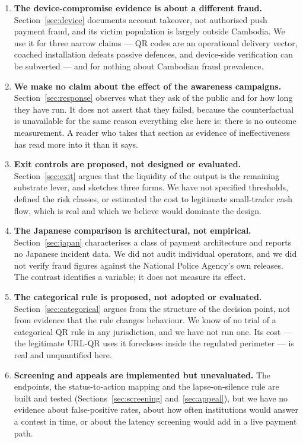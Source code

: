 \documentclass[10pt,a4paper,twocolumn]{article}
\begin{document}
\begin{enumerate}[leftmargin=1.6em]
  \item \textbf{The device-compromise evidence is about a different fraud.}
    Section~\ref{sec:device} documents account takeover, not authorised push
    payment fraud, and its victim population is largely outside Cambodia. We use
    it for three narrow claims --- QR codes are an operational delivery vector,
    coached installation defeats passive defences, and device-side verification
    can be subverted --- and for nothing about Cambodian fraud prevalence.

  \item \textbf{We make no claim about the effect of the awareness campaigns.}
    Section~\ref{sec:response} observes what they ask of the public and for how
    long they have run. It does not assert that they failed, because the
    counterfactual is unavailable for the same reason everything else here is:
    there is no outcome measurement. A reader who takes that section as evidence
    of ineffectiveness has read more into it than it says.

  \item \textbf{Exit controls are proposed, not designed or evaluated.}
    Section~\ref{sec:exit} argues that the liquidity of the output is the
    remaining substrate lever, and sketches three forms. We have not specified
    thresholds, defined the risk classes, or estimated the cost to legitimate
    small-trader cash flow, which is real and which we believe would dominate
    the design.

  \item \textbf{The Japanese comparison is architectural, not empirical.}
    Section~\ref{sec:japan} characterises a class of payment architecture and
    reports no Japanese incident data. We did not audit individual operators,
    and we did not verify fraud figures against the National Police Agency's own
    releases. The contrast identifies a variable; it does not measure its effect.

  \item \textbf{The categorical rule is proposed, not adopted or evaluated.}
    Section~\ref{sec:categorical} argues from the structure of the decision
    point, not from evidence that the rule changes behaviour. We know of no
    trial of a categorical QR rule in any jurisdiction, and we have not run one.
    Its cost --- the legitimate URL-QR uses it forecloses inside the regulated
    perimeter --- is real and unquantified here.

  \item \textbf{Screening and appeals are implemented but unevaluated.} The
    endpoints, the status-to-action mapping and the lapse-on-silence rule are
    built and tested (Sections~\ref{sec:screening} and~\ref{sec:appeal}), but we
    have no evidence about false-positive rates, about how often institutions
    would answer a contest in time, or about the latency screening would add in
    a live payment path.


\end{enumerate}
\end{document}

